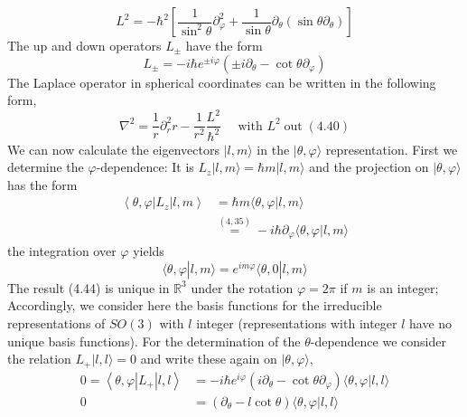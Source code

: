 \begin{equation}
    L^{2} =-\hbar^{2}\left[\frac{1}{\sin ^{2} \theta} \partial_{\varphi}^{2}+\frac{1}{\sin \theta} \partial_{\theta}\left(\sin \theta \partial_{\theta}\right)\right] 
\end{equation}
The up and down operators $L_{\pm}$ have the form
\begin{equation}
    L_{\pm}=-i \hbar e^{\pm i \varphi}\left(\pm i \partial_{\theta}-\cot \theta \partial_{\varphi}\right)
    \end{equation}
The Laplace operator in spherical coordinates can be written in the following form,
\begin{equation}
    \nabla^{2}=\frac{1}{r} \partial_{r}^{2} r-\frac{1}{r^{2}} \frac{L^{2}}{\hbar^{2}} \quad \text { with } L^{2} \operatorname{out}(4.40)
    \end{equation}
We can now calculate the eigenvectors $|l, m\rangle$ in the $|\theta,\varphi\rangle$ representation. First we determine the $\varphi$-dependence: It is $L_z | l, m\rangle = \hbar m | l, m\rangle$ and the projection on $|\theta,\varphi\rangle$ has the form
\begin{equation}
\begin{aligned}\left\langle\theta, \varphi\left|L_{z}\right| l, m\right\rangle &=\hbar m\langle\theta, \varphi | l, m\rangle \\ & \stackrel{(4,35)}{=}-i \hbar \partial_{\varphi}\langle\theta, \varphi | l, m\rangle \end{aligned}
\end{equation}
the integration over $\varphi$ yields
\begin{equation}
    \langle\theta, \varphi | l, m\rangle= e^{i m \varphi}\langle\theta, 0 | l, m\rangle
    \end{equation}
The result (4.44) is unique in $\mathbb{R}^3$ under the rotation $\varphi = 2\pi$ if $m$ is an integer; Accordingly, we consider here the basis functions for the irreducible representations of $SO (3)$ with $l$ integer (representations with integer $l$ have no unique basis functions). For the determination of the $\theta$-dependence we consider the relation $L_+ | l, l\rangle = 0$ and write these again on $|\theta,\varphi\rangle$,
\begin{equation}
\begin{aligned} 0=\left\langle\theta, \varphi\left|L_{+}\right| l, l\right\rangle &=- i \hbar e^{i \varphi}\left(i \partial_{\theta}-\cot \theta \partial_{\varphi}\right)\langle\theta, \varphi | l, l\rangle \\ 0 &=\left(\partial_{\theta}-l \cot \theta\right)\langle\theta, \varphi | l, l\rangle \end{aligned}
\end{equation}
